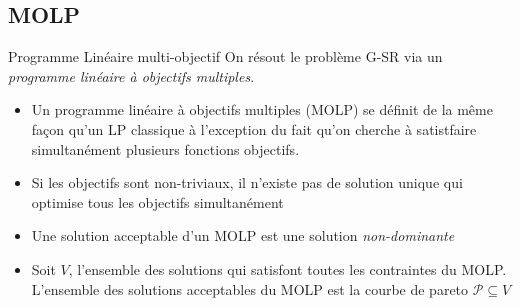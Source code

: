 \documentclass[compress]{beamer}
\theoremstyle{theorem}%
\begin{document}
\subsection{MOLP}
\begin{frame}{Programme Linéaire multi-objectif}
\footnotesize
  On résout le problème G-SR via un \textit{\color{fibeamer@orange}programme linéaire à objectifs multiples}.
  \begin{itemize}
    \item Un programme linéaire à objectifs multiples (MOLP) se définit de la même façon qu'un LP classique à l'exception du fait qu'on cherche à satistfaire \alert{simultanément} plusieurs fonctions objectifs.
    \item Si les objectifs sont non-triviaux, \alert{il n'existe pas de solution unique qui optimise tous les objectifs simultanément}
    \item Une solution acceptable d'un MOLP est une solution \textit{non-dominante}
    \item Soit $V$, l'ensemble des solutions qui satisfont toutes les
      contraintes du MOLP. L'ensemble des solutions acceptables du MOLP est la courbe de pareto $\mathcal{P} \subseteq V$
  \end{itemize}
\end{frame}
\end{document}
